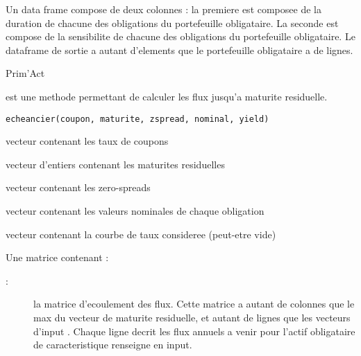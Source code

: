 \documentclass[a4paper]{book}
\begin{document}
%
\begin{Value}
Un data frame compose de deux colonnes : la premiere est composee de la duration de chacune des obligations du portefeuille obligataire.
La seconde est compose de la sensibilite de chacune des obligations du portefeuille obligataire.
Le dataframe de sortie a autant d'elements que le portefeuille obligataire a de lignes.
\end{Value}
%
\begin{Author}\relax
Prim'Act
\end{Author}
%
\begin{Description}\relax
{} est une methode permettant de calculer les flux jusqu'a maturite residuelle.
\end{Description}
%
\begin{Usage}
\begin{verbatim}
echeancier(coupon, maturite, zspread, nominal, yield)
\end{verbatim}
\end{Usage}
%
\begin{Arguments}
\begin{ldescription}
\item[\code{coupon}] vecteur contenant les taux de coupons

\item[\code{maturite}] vecteur d'entiers contenant les maturites residuelles

\item[\code{zspread}] vecteur contenant les zero-spreads

\item[\code{nominal}] vecteur contenant les valeurs nominales de chaque obligation

\item[\code{yield}] vecteur contenant la courbe de taux consideree (peut-etre vide)
\end{ldescription}
\end{Arguments}
%
\begin{Value}
Une matrice contenant :
\begin{description}

\item[ : ] la matrice d'ecoulement des flux. Cette matrice a autant de colonnes
que le max du vecteur de maturite residuelle, et autant de lignes que les vecteurs d'input .
Chaque ligne decrit les flux annuels a venir pour l'actif obligataire de caracteristique renseigne en input.

\end{description}

\end{Value}
\end{document}

